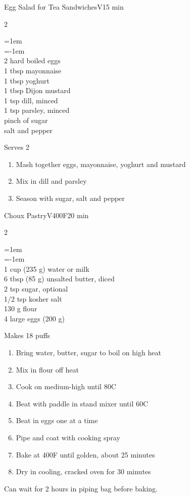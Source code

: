 \documentclass{article}
\newenvironment{recipe}[3][]
    {\begin{cardbase}[#1]{#2}{#3}
    \columnratio{0.333}
    \begin{paracol}{2}}
    {\end{paracol}\end{cardbase}}
\newenvironment{denserecipe}[3][]
    {\small
    \begin{recipe}[#1]{#2}{#3}}
    {\end{recipe}}
\newcommand{\nextcolumn}{\switchcolumn}
\newenvironment{ingredients}
    {
    \begin{obeylines}
    \vspace{\parskip}
    \setlength{\parskip}{0.25em}
    \vspace{-0.25em}
    \leftskip=1em
    \parindent=-1em}
    {\end{obeylines}}
\newenvironment{steps}
    {\begin{enumerate}[leftmargin=*,topsep=0pt]}
    {\end{enumerate}}
\newcommand{\celsius}[1]{#1\textdegree{}C}
\newcommand{\fahrenheit}[1]{#1\textdegree{}F}
\newcommand{\tag}[1]{\hspace{1em}#1}
\newcommand{\symboltag}[2]{\tag{#1\hspace{0.4em}#2}}
\newcommand{\totaltime}[1]{\symboltag{\raisebox{-0.1em}{\small\StopWatchEnd}}{#1}}
\newcommand{\preheat}[1]{\symboltag{\Topbottomheat}{#1}}
\begin{document}
\begin{recipe}{Egg Salad for Tea Sandwiches}{\tag{V}\totaltime{15 min}}
\begin{ingredients}
2 hard boiled eggs
1 tbsp mayonnaise
1 tbsp yoghurt
1 tbsp Dijon mustard
1 tsp dill, minced
1 tsp parsley, minced
pinch of sugar
salt and pepper
\end{ingredients}
\nextcolumn
Serves 2
\begin{steps}
    \item Mash together eggs, mayonnaise, yoghurt and mustard
    \item Mix in dill and parsley
    \item Season with sugar, salt and pepper
\end{steps}
\end{recipe}

\begin{denserecipe}{Choux Pastry}{\tag{V}\preheat{\fahrenheit{400}}\totaltime{20 min}}
\begin{ingredients}
1 cup (235 g) water or milk
6 tbsp (85 g) unsalted butter, diced
2 tsp sugar, optional
1/2 tsp kosher salt
130 g flour
4 large eggs (200 g)
\end{ingredients}
\nextcolumn
Makes 18 puffs
\begin{steps}
    \item Bring water, butter, sugar to boil on high heat
    \item Mix in flour off heat
    \item Cook on medium-high until \celsius{80}
    \item Beat with paddle in stand mixer until \celsius{60}
    \item Beat in eggs one at a time
    \item Pipe and coat with cooking spray
    \item Bake at \fahrenheit{400} until golden, about 25 minutes
    \item Dry in cooling, cracked oven for 30 minutes
\end{steps}
Can wait for 2 hours in piping bag before baking.
\end{denserecipe}
\end{document}
